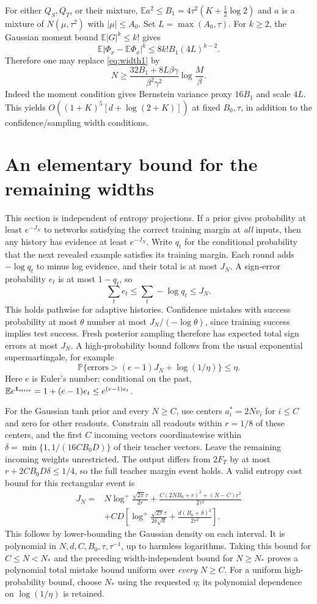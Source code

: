 \documentclass[11pt]{article}
\newcommand{\E}{\mathbb E}
\newcommand{\Pp}{\mathbb P}
\begin{document}
For either $Q_S,Q_T$, or their mixture, $\E a^2\le B_1=4\tau^2(K+\tfrac12\log2)$ and $a$ is a mixture of
$N(\mu,\tau^2)$ with $|\mu|\le A_0$. Set $L=\max(A_0,\tau)$.
For $k\ge2$, the Gaussian moment bound $\E|G|^k\le k!$ gives
\[
 \E|\Phi_x-\E\Phi_x|^k
 \le 8k!B_1(4L)^{k-2}.
\]
Therefore one may replace \eqref{eq:width1} by
\[
 N\ge\frac{32B_1+8L\beta\gamma}{\beta^2\gamma^2}
             \log\frac M\beta.
\]
Indeed the moment condition gives Bernstein variance proxy $16B_1$
and scale $4L$. This yields $O((1+K)^5[d+\log(2+K)])$ at fixed
$B_0,\tau$, in addition to the confidence/sampling width conditions.

\section{An elementary bound for the remaining widths}
This section is independent of entropy projections. If a prior gives
probability at least $e^{-J_N}$ to networks satisfying the correct
training margin at \emph{all} inputs, then any history has evidence
at least $e^{-J_N}$. Write $q_t$ for the conditional probability that
the next revealed example satisfies its training margin. Each round
adds $-\log q_t$ to minus log evidence, and their total is at most
$J_N$. A sign-error probability $e_t$ is at most $1-q_t$, so
\[
 \sum_t e_t\le\sum_t-\log q_t\le J_N.
\]
This holds pathwise for adaptive histories. Confidence mistakes with
success probability at most $\theta$ number at most
$J_N/(-\log\theta)$, since training success implies test success.
Fresh posterior sampling therefore has expected total sign errors
at most $J_N$. A high-probability bound follows from the usual
exponential supermartingale, for example
\[
 \Pp\{\text{errors}>(e-1)J_N+\log(1/\eta)\}\le\eta.
\]
Here $e$ is Euler's number: conditional on the past,
$\E e^{\mathbf1_{\rm error}}=1+(e-1)e_t\le e^{(e-1)e_t}$.

For the Gaussian tanh prior and every $N\ge C$, use centers
$a_i^*=2Nv_i$ for $i\le C$ and zero for other readouts. Constrain
all readouts within $r=1/8$ of these centers, and the first $C$ incoming
vectors coordinatewise within
$\delta=\min\{1,1/(16CB_0D)\}$ of their teacher vectors. Leave the
remaining incoming weights unrestricted. The output differs from
$2F_T$ by at most $r+2CB_0D\delta\le1/4$, so the full teacher margin
event holds. A valid entropy cost bound for this rectangular event is
\begin{align*}
 J_N={}&N\log^+\frac{\sqrt{2\pi}\tau}{2r}
  +\frac{C(2NB_0+r)^2+(N-C)r^2}{2\tau^2}\\
 &+CD\left[\log^+\frac{\sqrt{2\pi}\tau}{2\delta\sqrt d}
                 +\frac{d(B_0+\delta)^2}{2\tau^2}\right].
\end{align*}
This follows by lower-bounding the Gaussian density on each interval.
It is polynomial in $N,d,C,B_0,\tau,\tau^{-1}$, up to harmless
logarithms. Taking this bound for $C\le N<N_*$ and the preceding
width-independent bound for $N\ge N_*$ proves a polynomial total
mistake bound uniform over \emph{every} $N\ge C$. For a uniform
high-probability bound, choose $N_*$ using the requested $\eta$;
its polynomial dependence on $\log(1/\eta)$ is retained.
\end{document}

